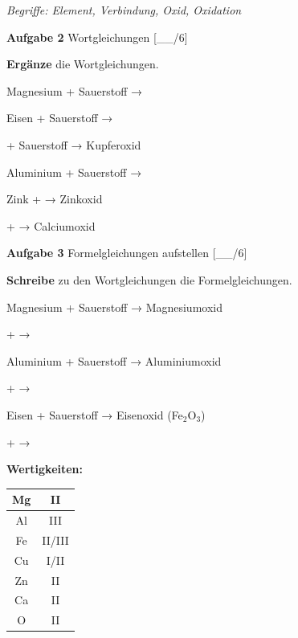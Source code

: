 \documentclass[10pt, a4paper]{article}
\newcommand{\luecke}[1]{\underline{\hspace{#1}}}
\newcommand{\punktebox}[1]{\hfill\small\textcolor{mittelgrau}{[\_\_/#1]}}
\newcommand{\aufgabe}[2]{%
    \vspace{6pt}%
    \noindent\textbf{\textcolor{fachfarbe}{Aufgabe #1}} #2%
    \vspace{3pt}%
    \nopagebreak[4]%
}
\newcommand{\operator}[1]{\textbf{\textcolor{fachfarbe}{#1}}}
\begin{document}
{\scriptsize\textit{Begriffe: Element, Verbindung, Oxid, Oxidation}}

\vspace{6pt}

\aufgabe{2}{Wortgleichungen} \punktebox{6}

\operator{Ergänze} die Wortgleichungen.

\small
\begin{teil}
    \item Magnesium + Sauerstoff → \luecke{4cm}
    \item Eisen + Sauerstoff → \luecke{4cm}
    \item \luecke{3cm} + Sauerstoff → Kupferoxid
    \item Aluminium + Sauerstoff → \luecke{4cm}
    \item Zink + \luecke{3cm} → Zinkoxid
    \item \luecke{3cm} + \luecke{3cm} → Calciumoxid
\end{teil}

\vspace{-4pt}


\aufgabe{3}{Formelgleichungen aufstellen} \punktebox{6}

\begin{minipage}[t]{0.75\textwidth}
\operator{Schreibe} zu den Wortgleichungen die Formelgleichungen.

\begin{teil}
    \item Magnesium + Sauerstoff → Magnesiumoxid

    \luecke{2.5cm} + \luecke{1.5cm} → \luecke{2.5cm}

    \item Aluminium + Sauerstoff → Aluminiumoxid

    \luecke{2.5cm} + \luecke{1.5cm} → \luecke{2.5cm}

    \item Eisen + Sauerstoff → Eisenoxid (Fe$_2$O$_3$)

    \luecke{2.5cm} + \luecke{1.5cm} → \luecke{2.5cm}
\end{teil}
\end{minipage}%
\hfill
\begin{minipage}[t]{0.22\textwidth}
\raggedleft
\small
\textbf{Wertigkeiten:}\\[0.3em]
\begin{tabular}{|c|c|}
\hline
Mg & II \\
\hline
Al & III \\
\hline
Fe & II/III \\
\hline
Cu & I/II \\
\hline
Zn & II \\
\hline
Ca & II \\
\hline
O & II \\
\hline
\end{tabular}
\end{minipage}
\end{document}
